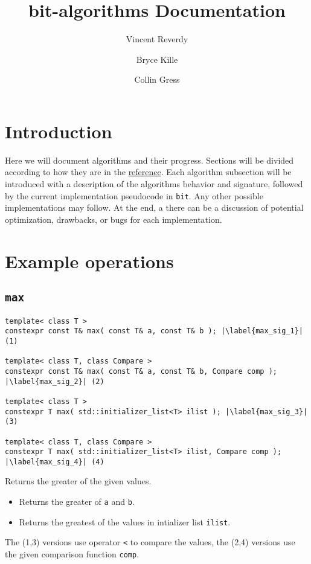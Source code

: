 \documentclass{article}
\title{bit-algorithms Documentation}
\author{
    Vincent Reverdy
    \and
    Bryce Kille
    \and
    Collin Gress
}
\begin{document}
 
\maketitle

\setcounter{secnumdepth}{2}
\setcounter{tocdepth}{2}
\tableofcontents

\section{Introduction}
Here we will document algorithms and their progress. 
Sections will be divided according to how they are in the 
\href{https://en.cppreference.com/w/cpp/algorithm}{reference}. Each algorithm 
subsection will be introduced with a description of the algorithms behavior 
and signature, followed by the current implementation pseudocode in \texttt{bit}. 
Any other possible implementations may follow. At the end, a there can be 
a discussion of potential optimization, drawbacks, or bugs for each 
implementation. 
\section{Example operations}\label{ExOs}
\subsection{\texttt{max}}
\begin{lstlisting}
template< class T > 
constexpr const T& max( const T& a, const T& b ); |\label{max_sig_1}| (1)

template< class T, class Compare >
constexpr const T& max( const T& a, const T& b, Compare comp ); |\label{max_sig_2}| (2)

template< class T >
constexpr T max( std::initializer_list<T> ilist ); |\label{max_sig_3}| (3)

template< class T, class Compare >
constexpr T max( std::initializer_list<T> ilist, Compare comp ); |\label{max_sig_4}| (4)
\end{lstlisting}

\noindent Returns the greater of the given values.
\begin{itemize}
  \item[1-2)] Returns the greater of \texttt{a} and \texttt{b}.
  \item[3-4)] Returns the greatest of the values in intializer list \texttt{ilist}. 
\end{itemize}
The (1,3) versions use operator \texttt{<} to compare the values, the (2,4) versions use the given comparison function \texttt{comp}.
\end{document}
